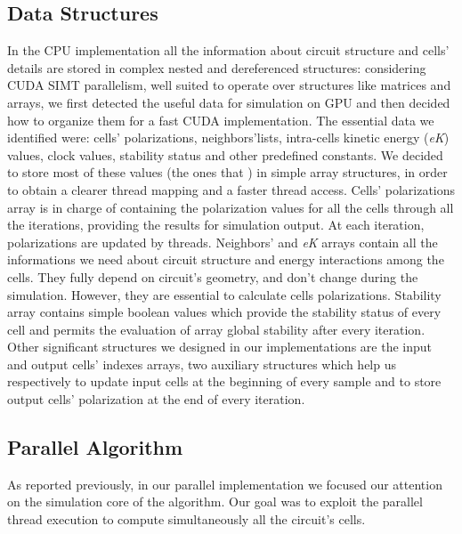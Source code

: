 \subsection{Data Structures}
In the CPU implementation all the information about circuit structure and cells' details are stored in complex nested and dereferenced structures:
considering CUDA SIMT parallelism, well suited to operate over structures like matrices and arrays, we first detected the useful data
for simulation on GPU and then decided how to organize them for a fast CUDA implementation.\newline
The essential data we identified were: cells' polarizations, neighbors'lists, intra-cells kinetic energy (\textit{eK}) values, clock values,
stability status and other predefined constants.\newline
We decided to store most of these values (the ones that ) in simple array structures, in order to obtain a clearer thread mapping and a faster thread access.\newline
Cells' polarizations array is in charge of containing the polarization values for all the cells through all the iterations, providing
the results for simulation output. At each iteration, polarizations are updated by threads.\newline
Neighbors' and \textit{eK} arrays contain all the informations we need about circuit structure and energy interactions among
the cells. They fully depend on circuit's geometry, and don't change during the simulation. However, they are essential to calculate 
cells polarizations.\newline
Stability array contains simple boolean values which provide the stability status of every cell and permits the evaluation of array global
stability after every iteration.\newline
Other significant structures we designed in our implementations are the input and output cells' indexes arrays, two auxiliary structures
which help us respectively to update input cells at the beginning of every sample and to store output cells' polarization at the end of 
every iteration.

\subsection{Parallel Algorithm}
As reported previously, in our parallel implementation we focused our attention on the simulation core of the algorithm.\newline
Our goal was to exploit the parallel thread execution to compute simultaneously all the circuit's cells. 

